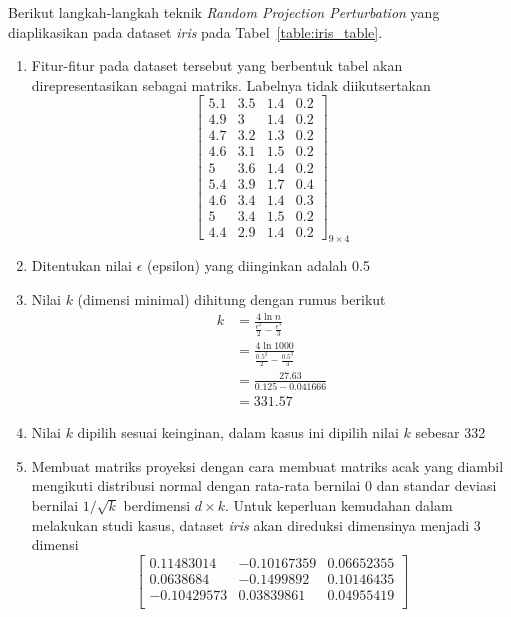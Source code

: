 \documentclass[a4paper,twoside]{article}
\begin{document}
\begin{enumerate}
		Berikut langkah-langkah teknik \textit{Random Projection Perturbation} yang diaplikasikan pada dataset \textit{iris} pada Tabel~\ref{table:iris_table}.
		\begin{enumerate}
			\item Fitur-fitur pada dataset tersebut yang berbentuk tabel akan direpresentasikan sebagai matriks. Labelnya tidak diikutsertakan
			\[
				\begin{bmatrix}
				5.1		&		3.5		&		1.4		&		0.2	\\
				4.9		&		3		&		1.4		&		0.2	\\
				4.7		&		3.2		&		1.3		&		0.2	\\
				4.6		&		3.1		&		1.5		&		0.2	\\
				5		&		3.6		&		1.4		&		0.2	\\
				5.4		&		3.9		&		1.7		&		0.4	\\
				4.6		&		3.4		&		1.4		&		0.3	\\
				5		&		3.4		&		1.5		&		0.2	\\
				4.4		&		2.9		&		1.4		&		0.2 
				\end{bmatrix}_{9\times 4}
			\]
			\item Ditentukan nilai \(\epsilon\) (epsilon) yang diinginkan adalah 0.5
			\item Nilai \(k\) (dimensi minimal) dihitung dengan rumus berikut
			\begin{align*}
				k &= \frac{4\ln{n}}{\frac{\epsilon^{2}}{2}-\frac{\epsilon^{3}}{3}} \\
				&= \frac{4\ln{1000}}{\frac{0.5^{2}}{2}-\frac{0.5^{3}}{3}} \\
				&= \frac{27.63}{0.125-0.041666} \\
				&= 331.57
			\end{align*}
			\item Nilai \(k\) dipilih sesuai keinginan, dalam kasus ini dipilih nilai \(k\) sebesar 332
			\item Membuat matriks proyeksi dengan cara membuat matriks acak yang diambil mengikuti distribusi normal dengan rata-rata bernilai 0 dan standar deviasi bernilai \(1/\sqrt{k}\) berdimensi \(d \times k\). Untuk keperluan kemudahan dalam melakukan studi kasus, dataset \textit{iris} akan direduksi dimensinya menjadi 3 dimensi
			\[
				\begin{bmatrix}
				0.11483014 &  -0.10167359  &  0.06652355 \\
				0.0638684 &   -0.1499892   &  0.10146435 \\
				-0.10429573 &   0.03839861 &   0.04955419 \\

\end{bmatrix}\]
\end{enumerate}
\end{enumerate}
\end{document}

